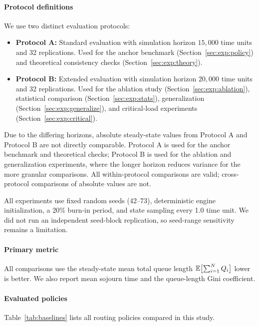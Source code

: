 \paragraph{Protocol definitions}
We use two distinct evaluation protocols:
\begin{itemize}
\item \textbf{Protocol A:} Standard evaluation with simulation horizon $15{,}000$ time units and 32 replications. Used for the anchor benchmark (Section~\ref{sec:exp:policy}) and theoretical consistency checks (Section~\ref{sec:exp:theory}).
\item \textbf{Protocol B:} Extended evaluation with simulation horizon $20{,}000$ time units and 32 replications. Used for the ablation study (Section~\ref{sec:exp:ablation}), statistical comparison (Section~\ref{sec:exp:stats}), generalization (Section~\ref{sec:exp:generalize}), and critical-load experiments (Section~\ref{sec:exp:critical}).
\end{itemize}
Due to the differing horizons, absolute steady-state values from Protocol A and Protocol B are not directly comparable.
Protocol A is used for the anchor benchmark and theoretical checks; Protocol B is used for the ablation and generalization experiments, where the longer horizon reduces variance for the more granular comparisons.
All within-protocol comparisons are valid; cross-protocol comparisons of absolute values are not.

All experiments use fixed random seeds (42--73), deterministic engine initialization, a 20\% burn-in period, and state sampling every 1.0 time unit. We did not run an independent seed-block replication, so seed-range sensitivity remains a limitation.

\paragraph{Primary metric}
All comparisons use the steady-state mean total queue length $\mathbb{E}\bigl[\sum_{i=1}^{N} Q_{i}\bigr]$ lower is better.
We also report mean sojourn time and the queue-length Gini coefficient.

\paragraph{Evaluated policies}
Table~\ref{tab:baselines} lists all routing policies compared in this study.

